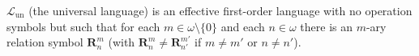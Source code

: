 $\mathcal{L}_{\text{un}}$ (the universal language) is an effective first-order language with no operation symbols but such that for each $m \in \omega \setminus \{0\}$ and each $n \in \omega$ there is an $m$-ary relation symbol $\mathbf{R}_n^m$ (with $\mathbf{R}_n^m \neq \mathbf{R}_{n'}^{m'}$ if $m \neq m'$ or $n \neq n'$).
